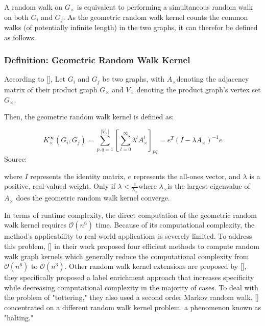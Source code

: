 A random walk on $G_{\times}$ is equivalent to performing a simultaneous random walk on both $G_{i}$ and $G_{j}$. As the geometric random walk kernel counts the common walks (of potentially infinite length) in the two graphs, it can therefor be defined as follows.

\subsubsection{Definition: Geometric Random Walk Kernel}

According to [\cite{Siglidis:2018}], Let $G_{i}$ and $G_{j}$ be two graphs, with $A_{\times}$denoting the adjacency matrix of their product graph $G_{\times}$ and $V_{\times}$ denoting the product graph's vertex set $G_{\times}$.

Then, the geometric random walk kernel is defined as:

\begin{equation}
K_{\times}^{\infty}\left(G_{i}, G_{j}\right)=\sum_{p, q=1}^{\left|V_{\times}\right|}\left[\sum_{l=0}^{\infty} \lambda^{l} A_{\times}^{l}\right]_{p q}=e^{T}\left(I-\lambda A_{\times}\right)^{-1} e  
\end{equation}
Source: \cite{Siglidis:2018}

where $I$ represents the identity matrix, $e$ represents the all-ones vector, and $\lambda$ is a positive, real-valued weight. Only if $\lambda<\frac{1}{\lambda_{\times}}$where $\lambda_{\times}$is the largest eigenvalue of $A_{\times}$ does the geometric random walk kernel converge.

In terms of runtime complexity, the direct computation of the geometric random walk kernel requires $\mathcal{O}\left(n^{6}\right)$ time. Because of its computational complexity, the method's applicability to real-world applications is severely limited. To address this problem, [\cite{Vishwanathan:2010}] in their work proposed four efficient methods to compute random walk graph kernels which generally reduce the computational complexity from $\mathcal{O}\left(n^{6}\right)$ to $\mathcal{O}\left(n^{3}\right)$. Other random walk kernel extensions are proposed by [\cite{Mahé:2004}], they specifically proposed a label enrichment approach that increases specificity while decreasing computational complexity in the majority of cases. To deal with the problem of "tottering," they also used a second order Markov random walk. [\cite{Sugiyama:2015}] concentrated on a different random walk kernel problem, a phenomenon known as "halting."


